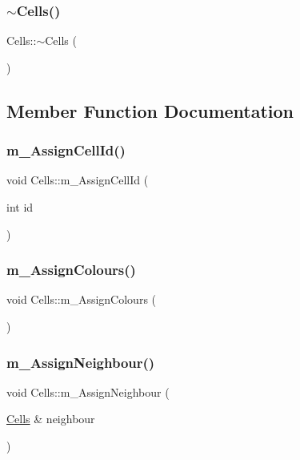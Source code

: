 \subsubsection{\texorpdfstring{$\sim$\+Cells()}{~Cells()}}
{\footnotesize\ttfamily Cells\+::$\sim$\+Cells (\begin{DoxyParamCaption}{ }\end{DoxyParamCaption})}



\subsection{Member Function Documentation}
\mbox{\label{class_cells_a72a566e099b35379c90ad4e90bbcd793}} 
\subsubsection{\texorpdfstring{m\+\_\+\+Assign\+Cell\+Id()}{m\_AssignCellId()}}
{\footnotesize\ttfamily void Cells\+::m\+\_\+\+Assign\+Cell\+Id (\begin{DoxyParamCaption}\item[{int}]{id }\end{DoxyParamCaption})}

\mbox{\label{class_cells_a4f59f13bfeec4f70dbd2133e86b747eb}} 
\subsubsection{\texorpdfstring{m\+\_\+\+Assign\+Colours()}{m\_AssignColours()}}
{\footnotesize\ttfamily void Cells\+::m\+\_\+\+Assign\+Colours (\begin{DoxyParamCaption}{ }\end{DoxyParamCaption})}

\mbox{\label{class_cells_a2d2d122fb7611a3f2c06f0e44b32dcdc}} 
\subsubsection{\texorpdfstring{m\+\_\+\+Assign\+Neighbour()}{m\_AssignNeighbour()}}
{\footnotesize\ttfamily void Cells\+::m\+\_\+\+Assign\+Neighbour (\begin{DoxyParamCaption}\item[{\mbox{\hyperlink{class_cells}{Cells}} \&}]{neighbour }\end{DoxyParamCaption})}

